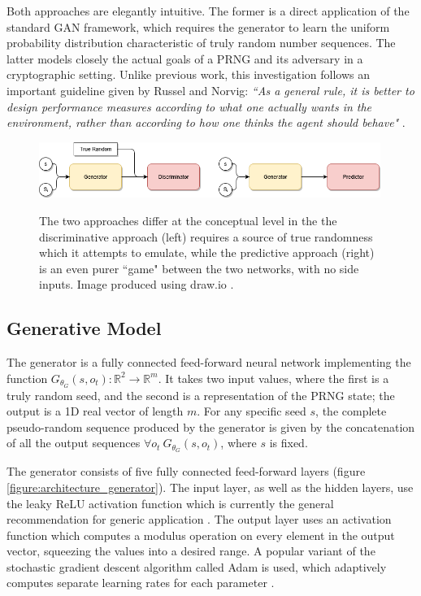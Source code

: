 \documentclass[12pt, titlepage]{report}
\theoremstyle{definition}
\begin{document}
Both approaches are elegantly intuitive. The former is a direct application of the standard GAN framework, which requires the generator to learn the uniform probability distribution characteristic of truly random number sequences. The latter models closely the actual goals of a PRNG and its adversary in a cryptographic setting. Unlike previous work, this investigation follows an important guideline given by Russel and Norvig: \textit{``As a general rule, it is better to design performance measures according to what one actually wants in the environment, rather than according to how one thinks the agent should behave"} \cite[p. 37]{russel2009artificial}.

\begin{figure}
\centering
\includegraphics[width=0.99\textwidth]{img/approach_comparison.png}\\
\caption{The two approaches differ at the conceptual level in the the discriminative approach (left) requires a source of true randomness which it attempts to emulate, while the predictive approach (right) is an even purer ``game" between the two networks, with no side inputs. Image produced using draw.io \cite{jgraph2018draw}.}
\label{figure:approach_comparison}
\end{figure}



\subsection{Generative Model}
The generator is a fully connected feed-forward neural network implementing the function $G_{\theta_{G}}(s, o_t) : \mathbb{R}^2 \rightarrow \mathbb{R}^m$. It takes two input values, where the first is a truly random seed, and the second is a representation of the PRNG state; the output is a 1D real vector of length $m$. For any specific seed $s$, the complete pseudo-random sequence produced by the generator is given by the concatenation of all the output sequences $\forall o_t\ G_{\theta_{G}}(s, o_t)$, where $s$ is fixed.

The generator consists of five fully connected feed-forward layers (figure \ref{figure:architecture_generator}). The input layer, as well as the hidden layers, use the leaky ReLU activation function which is currently the general recommendation for generic application \cite[Neural Networks Part 1: Setting up the Architecture]{karpathy2017cs231n}. The output layer uses an activation function which computes a modulus operation on every element in the output vector, squeezing the values into a desired range. A popular variant of the stochastic gradient descent algorithm called Adam is used, which adaptively computes separate learning rates for each parameter \cite{kingma2014adam} \cite[Optimization: Stochastic Gradient Descent]{karpathy2017cs231n}.
\end{document}
